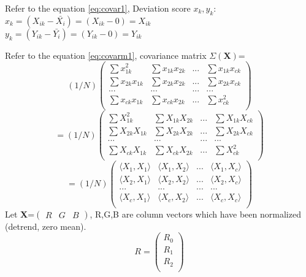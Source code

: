\begin{compactitem}
Refer to the equation \eqref{eq:covar1}, Deviation score $x_k, y_k$:\\
$x_{k}=(X_{ik}-\bar{X_i})=(X_{ik} - 0)= X_{ik}$ \\
$y_{k}=(Y_{ik}-\bar{Y_i})=(Y_{ik} - 0) = Y_{ik}$


Refer to the equation \eqref{eq:covarm1}, covariance matrix $\Sigma(\textbf{X})$=
\[
(1/N)
\begin{pmatrix}
       \sum x_{1k}^{2} 	& \sum x_{1k} x_{2k} 	& ...	& \sum x_{1k} x_{ck}	\\[0.3em]
       \sum x_{2k} x_{1k} 	& \sum x_{2k} x_{2k} 	& ...	& \sum x_{2k} x_{ck}	\\[0.3em]
       ...		& ...			& ...	&	...		\\[0.3em]
       \sum x_{ck} x_{1k} 	& \sum x_{ck} x_{2k} 	& ...	& \sum x_{ck}^{2}	\\[0.3em]
\end{pmatrix}
\]
\[
=(1/N)
\begin{pmatrix}
       \sum X_{1k}^{2} 	& \sum X_{1k} X_{2k} 	& ...	& \sum X_{1k} X_{ck}	\\[0.3em]
       \sum X_{2k} X_{1k} 	& \sum X_{2k} X_{2k} 	& ...	& \sum X_{2k} X_{ck}	\\[0.3em]
       ...		& ...			& ...	&	...		\\[0.3em]
       \sum X_{ck} X_{1k} 	& \sum X_{ck} X_{2k} 	& ...	& \sum X_{ck}^{2}	\\[0.3em]
\end{pmatrix}
\]
\[
=(1/N)
\begin{pmatrix}
       \langle X_1, X_1 \rangle	& \langle X_1, X_2 \rangle 	& ...	& \langle X_1, X_c	\rangle \\[0.3em]
       \langle X_2, X_1 \rangle 	& \langle X_2, X_2 \rangle	& ...	& \langle X_2, X_c	\rangle \\[0.3em]
       ...		& ...			& ...	&	...		\\[0.3em]
       \langle X_c, X_1 \rangle	& \langle X_c, X_2 \rangle 	& ...	& \langle X_c, X_c\rangle	\\[0.3em]
\end{pmatrix}
\]
Let \textbf{X}=$\begin{pmatrix} R & G & B \end{pmatrix}$, R,G,B are column vectors which have been normalized (detrend, zero mean).
\[
R=
\begin{pmatrix}
       R_0\\[0.3em]
       R_1\\[0.3em]
       R_2\\[0.3em]

\end{pmatrix}\]
\end{compactitem}
